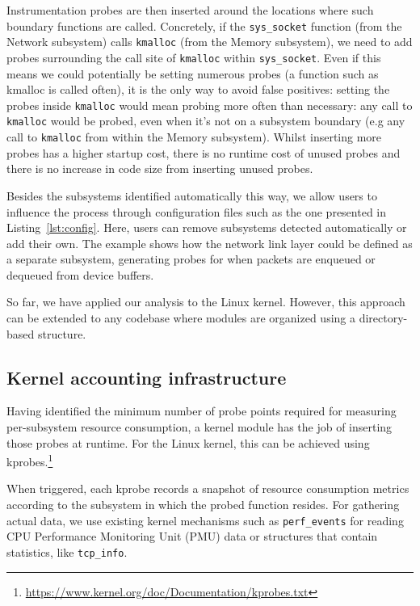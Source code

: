 \documentclass[12pt,twoside,a4paper]{article}
\begin{document}
Instrumentation probes are then inserted around the locations where such
boundary functions are called. Concretely, if the \texttt{sys\_socket} function
(from the Network subsystem) calls \texttt{kmalloc} (from the Memory subsystem),
we need to add probes surrounding the call site of \texttt{kmalloc} within
\texttt{sys\_socket}. Even if this means we could potentially be setting
numerous probes (a function such as kmalloc is called often), it is the only way
to avoid false positives: setting the probes inside \texttt{kmalloc} would mean
probing more often than necessary: any call to \texttt{kmalloc} would be probed,
even when it's not on a subsystem boundary (e.g any call to \texttt{kmalloc} from
within the Memory subsystem). Whilst inserting more probes has a higher startup
cost, there is no runtime cost of unused probes and there is no increase in code
size from inserting unused probes.

Besides the subsystems identified automatically this way, we allow users to
influence the process through configuration files such as the one presented in
Listing~\ref{lst:config}. Here, users can remove subsystems detected
automatically or add their own. The example shows how the network link layer
could be defined as a separate subsystem, generating probes for when packets are
enqueued or dequeued from device buffers.

So far, we have applied our analysis to the Linux kernel. However, this
approach can be extended to any codebase where modules are organized using a
directory-based structure.


\subsection{Kernel accounting infrastructure}

Having identified the minimum number of probe points required for measuring per-subsystem
resource consumption, a kernel module has the job of inserting those probes at runtime.
For the Linux kernel, this can be achieved using kprobes.\footnote{\url{https://www.kernel.org/doc/Documentation/kprobes.txt}}

When triggered, each kprobe records a snapshot of resource consumption metrics according
to the subsystem in which the probed function resides. For gathering actual data, we
use existing kernel mechanisms such as \texttt{perf\_events} for reading CPU Performance Monitoring Unit (PMU)
data or structures that contain statistics, like \texttt{tcp\_info}.
\end{document}
